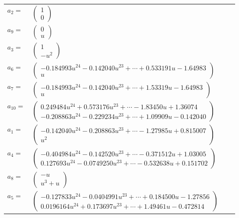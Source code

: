 \documentclass[1p]{elsarticle_modified}
\theoremstyle{definition}
\begin{document}
\begin{tabular}{m{7pt} m{180pt} m{7pt} m{180pt} }
\flushright $a_{2}=$&$\begin{pmatrix}1\\0\end{pmatrix}$ \\
\flushright $a_{9}=$&$\begin{pmatrix}0\\u\end{pmatrix}$ \\
\flushright $a_{3}=$&$\begin{pmatrix}1\\- u^2\end{pmatrix}$ \\
\flushright $a_{6}=$&$\begin{pmatrix}-0.184993 u^{24}-0.142040 u^{23}+\cdots+0.533191 u-1.64983\\u\end{pmatrix}$ \\
\flushright $a_{7}=$&$\begin{pmatrix}-0.184993 u^{24}-0.142040 u^{23}+\cdots+1.53319 u-1.64983\\u\end{pmatrix}$ \\
\flushright $a_{10}=$&$\begin{pmatrix}0.249484 u^{24}+0.573176 u^{23}+\cdots-1.83450 u+1.36074\\-0.208863 u^{24}-0.229234 u^{23}+\cdots+1.09909 u-0.142040\end{pmatrix}$ \\
\flushright $a_{1}=$&$\begin{pmatrix}-0.142040 u^{24}-0.208863 u^{23}+\cdots-1.27985 u+0.815007\\u^2\end{pmatrix}$ \\
\flushright $a_{4}=$&$\begin{pmatrix}-0.404984 u^{24}-0.142520 u^{23}+\cdots-0.371512 u+1.03005\\0.127693 u^{24}-0.0749250 u^{23}+\cdots-0.532638 u+0.151702\end{pmatrix}$ \\
\flushright $a_{8}=$&$\begin{pmatrix}- u\\u^3+u\end{pmatrix}$ \\
\flushright $a_{5}=$&$\begin{pmatrix}-0.127833 u^{24}-0.0404991 u^{23}+\cdots+0.184500 u-1.27856\\0.0196164 u^{24}+0.173697 u^{23}+\cdots+1.49461 u-0.472814\end{pmatrix}$ \\

\end{tabular}
\end{document}
